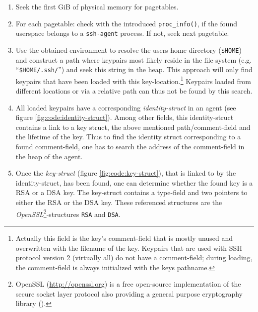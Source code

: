 \begin{enumerate}

	\item Seek the first GiB of physical memory for pagetables.

	\item For each pagetable: check with the introduced
	\texttt{proc\_info()}, if the found userspace belongs to a
	\texttt{ssh-agent} process. If not, seek next pagetable.

	\item Use the obtained environment to resolve the users home directory
	(\texttt{\$HOME}) and construct a path where keypairs most likely reside
	in the file system (e.g.  ``\texttt{\$HOME/.ssh/}'') and seek this
	string in the heap.  This approach will only find keypairs that have
	been loaded with this key-location.\footnote{Actually this field is the
	key's comment-field that is mostly unused and overwritten with the
	filename of the key. Keypairs that are used with SSH protocol version 2
	(virtually all) do not have a comment-field; during loading, the
	comment-field is always initialized with the keys pathname.} Keypairs
	loaded from different locations or via a relative path can thus not be
	found by this search.
	
	\item All loaded keypairs have a corresponding \emph{identity-struct} in
		an agent (see figure \ref{fig:code:identity-struct}). Among
		other fields, this identity-struct contains a link to a key
		struct, the above mentioned path/comment-field and the lifetime
		of the key. Thus to find the identity struct corresponding to a
		found comment-field, one has to search the address of the
		comment-field in the heap of the agent.
	
	\item Once the \emph{key-struct} (figure \ref{fig:code:key-struct}),
		that is linked to by the identity-struct, has been found, one
		can determine whether the found key is a RSA or a DSA key.  The
		key-struct contains a type-field and two pointers to either the
		RSA or the DSA key.  These referenced structures are the
		\emph{OpenSSL}\footnote{OpenSSL
		(\href{http://openssl.org}{http://openssl.org}) is a free
		open-source implementation of the secure socket layer protocol
		also providing a general purpose cryptography library
		().}-structures \texttt{RSA} and \texttt{DSA}.
	

\end{enumerate}
